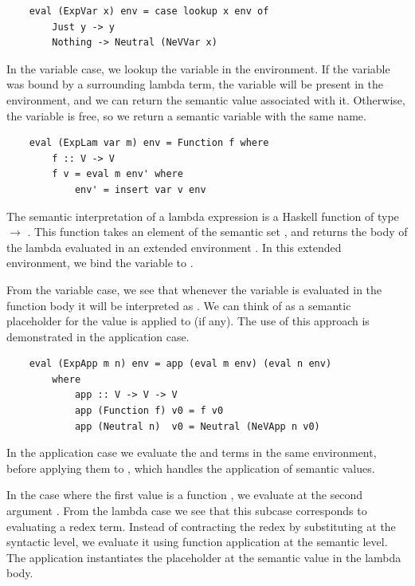 \begin{lstlisting}
    eval (ExpVar x) env = case lookup x env of
        Just y -> y
        Nothing -> Neutral (NeVVar x)
\end{lstlisting}

In the variable case, we lookup the variable in the environment. If the variable was bound by a surrounding lambda term, the variable will be present in the environment, and we can return the semantic value associated with it. Otherwise, the variable is free, so we return a semantic variable with the same name.

\begin{lstlisting}
    eval (ExpLam var m) env = Function f where
        f :: V -> V
        f v = eval m env' where
            env' = insert var v env
\end{lstlisting}

The semantic interpretation of a lambda expression is a Haskell function of type  $\rightarrow$ . This function takes an element  of the semantic set , and returns the body of the lambda evaluated in an extended environment . In this extended environment, we bind the variable  to .

From the variable case, we see that whenever the variable  is evaluated in the function body it will be interpreted as . We can think of  as a semantic placeholder for the value  is applied to (if any). The use of this approach is demonstrated in the application case.

\begin{lstlisting}
    eval (ExpApp m n) env = app (eval m env) (eval n env)
        where
            app :: V -> V -> V
            app (Function f) v0 = f v0
            app (Neutral n)  v0 = Neutral (NeVApp n v0)
\end{lstlisting}

In the application case we evaluate the  and  terms in the same environment, before applying them to , which handles the application of semantic values. 

In the case where the first value is a function , we evaluate  at the second argument . From the lambda case we see that this subcase corresponds to evaluating a redex term. Instead of contracting the redex by substituting at the syntactic level, we evaluate it using function application at the semantic level. The application instantiates the placeholder  at the semantic value  in the lambda body. 

